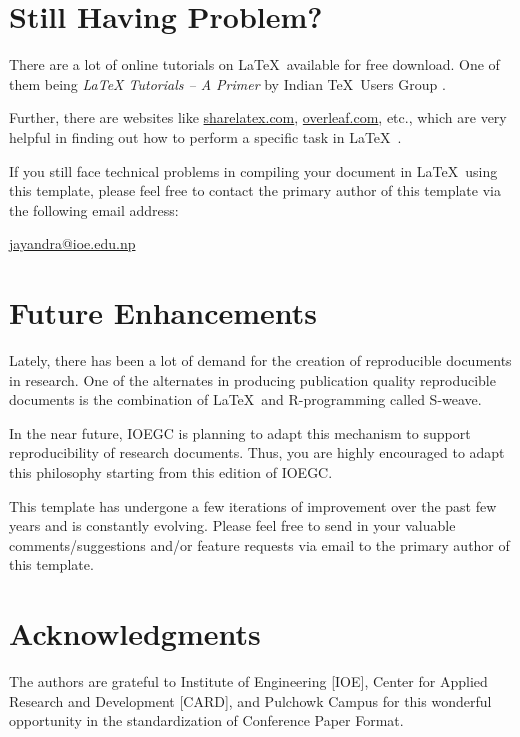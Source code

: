 \documentclass[fleqn, 11pt, twoside]{IOEGC2019}
\begin{document}
\section*{Still Having Problem?} 
There are a lot of online tutorials on \LaTeX\ available for free download. 
One of them being \textit{LaTeX Tutorials -- A Primer} by Indian \TeX\ Users 
Group \cite{ltxprimer}.

Further, there are websites like \url{sharelatex.com}, \url{overleaf.com}, etc.,
 which are very helpful
in finding out how to perform a specific task in \LaTeX\ .

If you still face technical problems in compiling your document in \LaTeX\ using
this template, please feel free to contact the primary author of this template 
via the following email address:

\centerline{\url{jayandra@ioe.edu.np}}

\section*{Future Enhancements}
Lately, there has been a lot of demand for the creation of reproducible 
documents in research. One of the alternates in producing publication quality 
reproducible documents is the combination of \LaTeX\ and R-programming called 
S-weave. 

In the near future, IOEGC is planning to adapt this mechanism to support 
reproducibility of research documents. Thus, you are highly encouraged to adapt 
this philosophy starting from this edition of IOEGC.

This template has undergone a few iterations of improvement over the past few 
years and is constantly evolving. Please feel free to send in your valuable 
comments/suggestions and/or feature requests via email to the primary author 
of this template.

\section*{Acknowledgments} 
The authors are grateful to Institute of Engineering [IOE], Center for Applied 
Research and Development [CARD], and Pulchowk Campus for this wonderful 
opportunity in the standardization of Conference Paper Format.





\vfill\null
\end{document}
